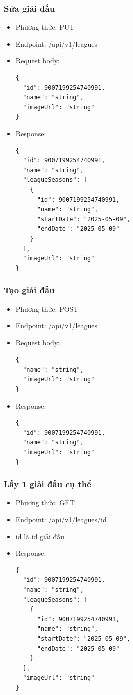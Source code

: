 \documentclass[../BTL.tex]{subfiles}
\begin{document}
\subsubsection{ Sửa giải đấu}
\begin{itemize}
    \item Phương thức: PUT
    \item Endpoint: /api/v1/leagues
    \item Request body:
        \begin{verbatim}
{
  "id": 9007199254740991,
  "name": "string",
  "imageUrl": "string"
}
        \end{verbatim}
    \item Response:
        \begin{verbatim}
{
  "id": 9007199254740991,
  "name": "string",
  "leagueSeasons": [
    {
      "id": 9007199254740991,
      "name": "string",
      "startDate": "2025-05-09",
      "endDate": "2025-05-09"
    }
  ],
  "imageUrl": "string"
}
        \end{verbatim}
\end{itemize}

\subsubsection{ Tạo giải đấu}
\begin{itemize}
    \item Phương thức: POST
    \item Endpoint: /api/v1/leagues
    \item Request body:
        \begin{verbatim}
{
  "name": "string",
  "imageUrl": "string"
}
        \end{verbatim}
    \item Response:
        \begin{verbatim}
{
  "id": 9007199254740991,
  "name": "string",
  "imageUrl": "string"
}
        \end{verbatim}
\end{itemize}

\subsubsection{ Lấy 1 giải đấu cụ thể}
\begin{itemize}
    \item Phương thức: GET
    \item Endpoint: /api/v1/leagues/{id}
    \item {id} là id giải đấu
    \item Response:
        \begin{verbatim}
{
  "id": 9007199254740991,
  "name": "string",
  "leagueSeasons": [
    {
      "id": 9007199254740991,
      "name": "string",
      "startDate": "2025-05-09",
      "endDate": "2025-05-09"
    }
  ],
  "imageUrl": "string"
}
        \end{verbatim}
\end{itemize}
\end{document}
